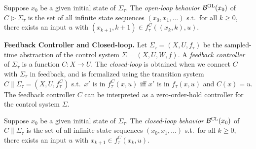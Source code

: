 Suppose $x_0$ be a given initial state of $\Sigma_\tau$.
The \emph{open-loop behavior} $\mathcal{B}^{\mathrm{OL}}(x_0)$ of $C \triangleright\Sigma_\tau$ is the set of all infinite state sequences $(x_0,x_1,\ldots)$ s.t.\ for all $k\geq 0$, there exists an input $u$ with $(x_{k+1},k+1)\in f_\tau^C((x_k,k),u)$.

\smallskip
\noindent\textbf{Feedback Controller and Closed-loop.}
Let $\Sigma_\tau=(X,U,f_\tau)$ be the sampled-time abstraction of the control system $\Sigma=(X,U,W,f)$.
A \emph{feedback controller} of $\Sigma_\tau$ is a function $C:X\rightarrow U$.
The \emph{closed-loop} is obtained when we connect $C$ with $\Sigma_\tau$ in feedback, and is formalized using the transition system $C\parallel\Sigma_\tau = (X,U,f_\tau^C)$ s.t.\ $x'$ is in $f_\tau^C(x,u)$ iff $x'$ is in $f_\tau(x,u)$ and $C(x)=u$.
The feedback controller $C$ can be interpreted as a zero-order-hold controller for the control system $\Sigma$.

Suppose $x_0$ be a given initial state of $\Sigma_\tau$.
The \emph{closed-loop behavior} $\mathcal{B}^{\mathrm{CL}}(x_0)$ of $C\parallel\Sigma_\tau$ is the set of all infinite state sequences $(x_0,x_1,\ldots)$ s.t.\ for all $k\geq 0$, there exists an input $u$ with $x_{k+1}\in f_\tau^C(x_k,u)$.



